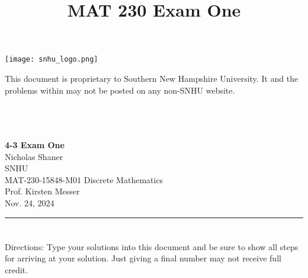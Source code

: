 \documentclass{amsart}
\theoremstyle{definition}
\theoremstyle{Exercise}
\theoremstyle{remark}
\theoremstyle{rule}
\numberwithin{equation}{section}
\begin{document}
\title{\sf MAT 230 Exam One}%


\begin{center}\doublespacing
\texttt{[image: snhu\_logo.png]}
\end{center}

\maketitle
This document is proprietary to Southern New Hampshire University. It and the problems within may not be posted on any non-SNHU website.\\\\\\\\
\begin{center}\doublespacing
\textbf{4-3 Exam One}\\
Nicholas Shaner\\
SNHU\\
MAT-230-15848-M01 Discrete Mathematics\\
Prof. Kirsten Messer\\
Nov. 24, 2024
\end{center}

\begin{center}
\rule{\textwidth}{0.4pt}
\end{center}
\newpage
\section*{}
\section*{}
Directions: Type your solutions into this document and be sure to show all steps for arriving at your solution. Just giving a final number may not receive full credit.
\\
\end{document}
